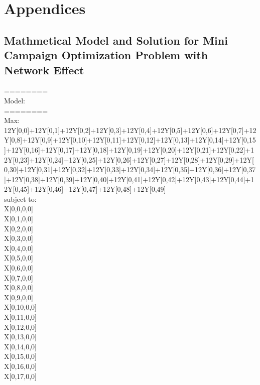 \documentclass[11pt]{article}
\begin{document}
\newpage

\appendix
\section{Appendices}
\subsection{Mathmetical Model and Solution for Mini Campaign Optimization Problem with Network Effect}\label{s:apendix-mini-net-cplex-sol}
========\\
Model:\\
========\\
Max:\\
        12Y[0,0]+12Y[0,1]+12Y[0,2]+12Y[0,3]+12Y[0,4]+12Y[0,5]+12Y[0,6]+12Y[0,7]+12Y[0,8]+12Y[0,9]+12Y[0,10]+12Y[0,11]+12Y[0,12]+12Y[0,13]+12Y[0,14]+12Y[0,15]+12Y[0,16]+12Y[0,17]+12Y[0,18]+12Y[0,19]+12Y[0,20]+12Y[0,21]+12Y[0,22]+12Y[0,23]+12Y[0,24]+12Y[0,25]+12Y[0,26]+12Y[0,27]+12Y[0,28]+12Y[0,29]+12Y[0,30]+12Y[0,31]+12Y[0,32]+12Y[0,33]+12Y[0,34]+12Y[0,35]+12Y[0,36]+12Y[0,37]+12Y[0,38]+12Y[0,39]+12Y[0,40]+12Y[0,41]+12Y[0,42]+12Y[0,43]+12Y[0,44]+12Y[0,45]+12Y[0,46]+12Y[0,47]+12Y[0,48]+12Y[0,49]\\
subject to:\\
        X[0,0,0,0] \\
        X[0,1,0,0] \\
        X[0,2,0,0] \\
        X[0,3,0,0] \\
        X[0,4,0,0] \\
        X[0,5,0,0] \\
        X[0,6,0,0] \\
        X[0,7,0,0] \\
        X[0,8,0,0] \\
        X[0,9,0,0] \\
        X[0,10,0,0] \\
        X[0,11,0,0] \\
        X[0,12,0,0] \\
        X[0,13,0,0] \\
        X[0,14,0,0] \\
        X[0,15,0,0] \\
        X[0,16,0,0] \\
        X[0,17,0,0] \\
\end{document}

